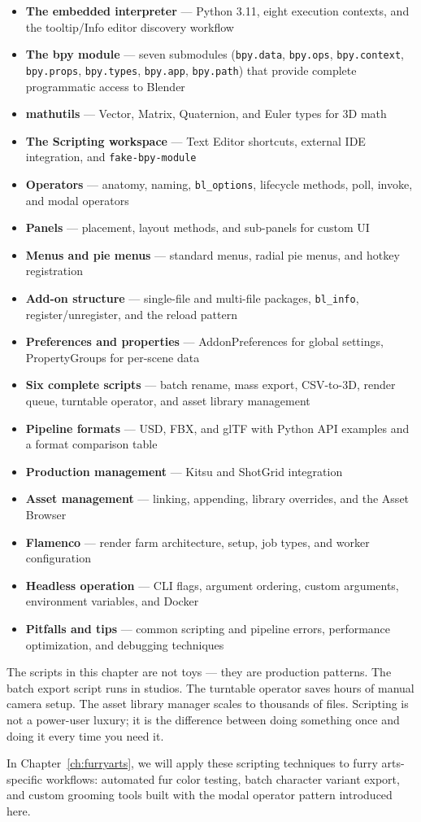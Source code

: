 \begin{itemize}[leftmargin=2em]
  \item \textbf{The embedded interpreter} --- Python 3.11, eight execution contexts, and the tooltip/Info editor discovery workflow
  \item \textbf{The bpy module} --- seven submodules (\texttt{bpy.data}, \texttt{bpy.ops}, \texttt{bpy.context}, \texttt{bpy.props}, \texttt{bpy.types}, \texttt{bpy.app}, \texttt{bpy.path}) that provide complete programmatic access to Blender
  \item \textbf{mathutils} --- Vector, Matrix, Quaternion, and Euler types for 3D math
  \item \textbf{The Scripting workspace} --- Text Editor shortcuts, external IDE integration, and \texttt{fake-bpy-module}
  \item \textbf{Operators} --- anatomy, naming, \texttt{bl\_options}, lifecycle methods, poll, invoke, and modal operators
  \item \textbf{Panels} --- placement, layout methods, and sub-panels for custom UI
  \item \textbf{Menus and pie menus} --- standard menus, radial pie menus, and hotkey registration
  \item \textbf{Add-on structure} --- single-file and multi-file packages, \texttt{bl\_info}, register/unregister, and the reload pattern
  \item \textbf{Preferences and properties} --- AddonPreferences for global settings, PropertyGroups for per-scene data
  \item \textbf{Six complete scripts} --- batch rename, mass export, CSV-to-3D, render queue, turntable operator, and asset library management
  \item \textbf{Pipeline formats} --- USD, FBX, and glTF with Python API examples and a format comparison table
  \item \textbf{Production management} --- Kitsu and ShotGrid integration
  \item \textbf{Asset management} --- linking, appending, library overrides, and the Asset Browser
  \item \textbf{Flamenco} --- render farm architecture, setup, job types, and worker configuration
  \item \textbf{Headless operation} --- CLI flags, argument ordering, custom arguments, environment variables, and Docker
  \item \textbf{Pitfalls and tips} --- common scripting and pipeline errors, performance optimization, and debugging techniques
\end{itemize}

The scripts in this chapter are not toys --- they are production patterns. The batch export script runs in studios. The turntable operator saves hours of manual camera setup. The asset library manager scales to thousands of files. Scripting is not a power-user luxury; it is the difference between doing something once and doing it every time you need it.

In Chapter~\ref{ch:furryarts}, we will apply these scripting techniques to furry arts-specific workflows: automated fur color testing, batch character variant export, and custom grooming tools built with the modal operator pattern introduced here.
